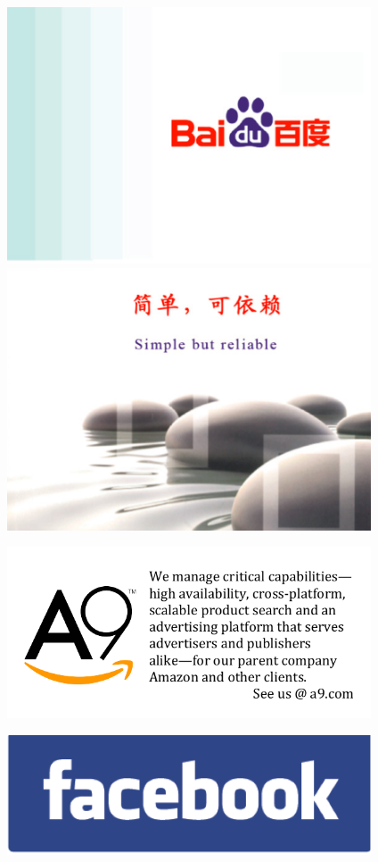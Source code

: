 \clearpage
\thispagestyle{empty}

\includegraphics[width=4.25in]{content/ads/Baidu-top.PNG}
\includegraphics[width=4.25in]{content/ads/Baidu-bottom.PNG}

\newpage
\thispagestyle{empty}

\includegraphics[width=4.25in]{content/ads/silver/A9-Ad.pdf}

\vfill

\includegraphics[width=4.25in]{content/ads/bronze/facebook.png}

